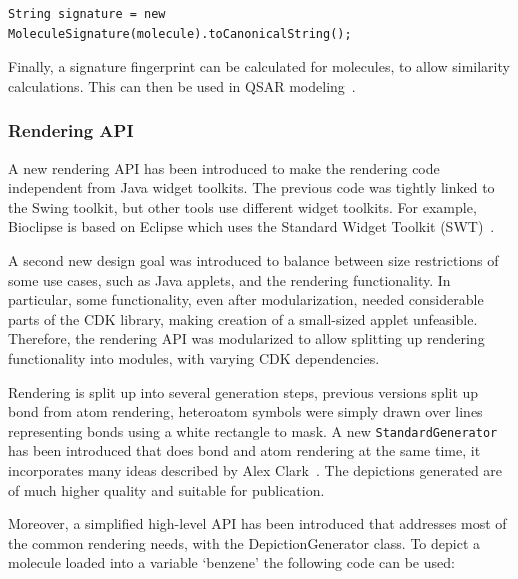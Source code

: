 \documentclass[10pt]{bmcart}
\begin{document}
\vspace{0.2cm}
\begin{verbatim}
String signature = new MoleculeSignature(molecule).toCanonicalString();
\end{verbatim}
\vspace{0.2cm}

  Finally, a signature fingerprint can be calculated for molecules, to allow
  similarity calculations. This can then be used in QSAR modeling~\cite{Alvarsson2016,
  signaturefingerprints,Spjuth2011DS,Moghadam2015,Alvarsson2014,Spjuth2012OS,Norinder2013}.

  \subsubsection*{Rendering API}

  A new rendering API has been introduced to make the rendering code independent
  from Java widget toolkits. The previous code was tightly linked to the Swing
  toolkit, but other tools use different widget toolkits. For example, Bioclipse
  is based on Eclipse which uses the Standard Widget Toolkit (SWT)~\cite{spjuth2007bioclipse}.
  
  A second new design goal was introduced to balance between size restrictions
  of some use cases, such as Java applets, and the rendering functionality. In
  particular, some functionality, even after modularization, needed considerable
  parts of the CDK library, making creation of a small-sized applet unfeasible.
  Therefore, the rendering API was modularized to allow splitting up rendering
  functionality into modules, with varying CDK dependencies.

  Rendering is split up into several generation steps, previous versions split
  up bond from atom rendering, heteroatom symbols were simply drawn over lines
  representing bonds using a white rectangle to mask. A new \texttt{StandardGenerator}
  has been introduced that does bond and atom rendering at the same time, it incorporates
  many ideas described by Alex Clark~\cite{Clark10,Clark13}. The depictions generated are of much
  higher quality and suitable for publication.

  
  Moreover, a simplified high-level API has been introduced that addresses most of the
  common rendering needs, with the DepictionGenerator class. To depict a molecule
  loaded into a variable `benzene' the following code can be used:
\end{document}
